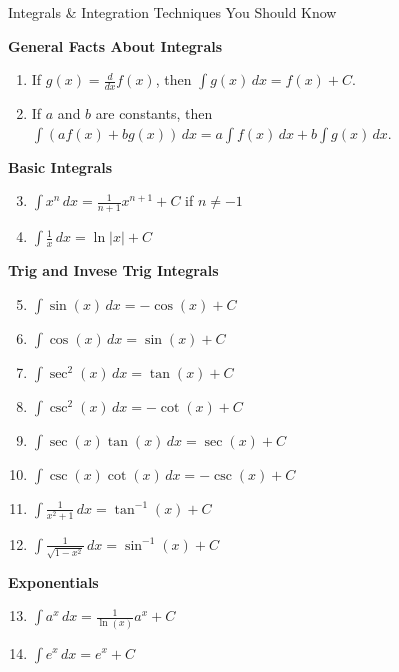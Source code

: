 \documentclass[12pt]{article}
\begin{document}
	\noindent\begin{center}\Large{Integrals \& Integration Techniques You Should Know}\end{center}
	\vspace{0.25in}
	\textbf{General Facts About Integrals}
	\begin{enumerate}
		\item If $g(x)=\frac{d}{dx}f(x)$, then $\int g(x)\,dx=f(x)+C$.
		\item If $a$ and $b$ are constants, then $\int \left(af(x)+bg(x)\right)\,dx=a\int f(x)\,dx+b\int g(x)\,dx$.
	\end{enumerate}

	\vspace{0.25in}
	
	\noindent\textbf{Basic Integrals}
	\begin{multicols}{2}
	\begin{enumerate}
		\setcounter{enumi}{2}
		\item $\int x^n\,dx= \frac{1}{n+1}x^{n+1} + C$ if $n\neq -1$
		\item $\int \frac{1}{x}\,dx = \ln|x|+C$
	\end{enumerate}
	\end{multicols}

	\vspace{0.25in}
	
	\noindent\textbf{Trig and Invese Trig Integrals}
	\begin{multicols}{2}
	\begin{enumerate}
		\setcounter{enumi}{4}
		\item $\int \sin(x)\,dx=-\cos(x)+C$
		\item $\int \cos(x)\,dx=\sin(x)+C$
		\item $\int \sec^2(x)\,dx=\tan(x)+C$
		\item $\int \csc^2(x)\,dx=-\cot(x)+C$
		\item $\int \sec(x)\tan(x)\,dx=\sec(x)+C$
		\item $\int \csc(x)\cot(x)\,dx=-\csc(x)+C$
		\item $\int \frac{1}{x^2+1}\,dx=\tan^{-1}(x)+C$
		\item $\int \frac{1}{\sqrt{1-x^2}}\,dx=\sin^{-1}(x)+C$
	\end{enumerate}
	\end{multicols}

	\vspace{0.25in}
	
	\noindent\textbf{Exponentials}
	\begin{multicols}{2}
	\begin{enumerate}
		\setcounter{enumi}{12}
		\item $\int a^x\,dx=\frac{1}{\ln(x)}a^x+C$
		\item $\int e^x\,dx=e^x+C$
	\end{enumerate}
	\end{multicols}
	
\end{document}
